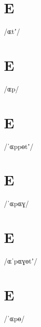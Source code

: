 \documentclass[10pt,a4paper,twoside]{book}
\begin{document}
\section*{E}

\begin{multicols}{3}
 {/ɶtʼ/} {}
\end{multicols}

\section*{E}

\begin{multicols}{3}
 {/ɶp/} {}
\end{multicols}

\section*{E}

\begin{multicols}{3}
 {/ˈɶppɵtʼ/} {}
\end{multicols}

\section*{E}

\begin{multicols}{3}
 {/ˈɶpɶɣ/} {}
\end{multicols}

\section*{E}

\begin{multicols}{3}
 {/ɶˈpɶɣɵtʼ/} {}
\end{multicols}

\section*{E}

\begin{multicols}{3}
 {/ˈɶpɵ/} {}
\end{multicols}
\end{document}
